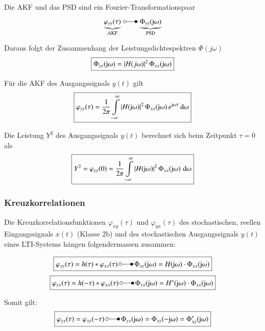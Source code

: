 Die AKF und das PSD sind ein Fourier-Transformationspaar
$$ \underbrace{\varphi_{yy}(\tau)}_{\text{AKF}} \, \laplace \, \underbrace{\Phi_{yy}(\jimg  \omega)}_{\text{PSD}} $$

Daraus folgt der Zusammenhang der Leistungsdichtespektren $\Phi(j \omega)$
$$ \boxed{ \Phi_{yy}(\mathrm{j}  \omega) = |H(j \omega)|^2 \, \Phi_{xx}(\mathrm{j}  \omega) } $$

Für die AKF des Ausgangssignals $y(t)$ gilt 
$$ \boxed{ \varphi_{yy}(\tau) = \frac{1}{2 \pi} \int\limits_{- \infty}^{\infty} |H(\mathrm{j}  \omega)|^2 \, \Phi_{xx}(\mathrm{j}  \omega) \, e^{\mathrm{j}  \omega \tau} \mathop{} \! \mathrm{d} \omega } $$

Die Leistung $Y^2$ des Ausgangssignals $y(t)$ berechnet sich beim Zeitpunkt $\tau = 0$ als
$$ \boxed{ Y^2 = \varphi_{yy}(0) = \frac{1}{2 \pi} \int\limits_{- \infty}^{\infty} |H(\mathrm{j}  \omega)|^2 \, \Phi_{xx}(\mathrm{j}  \omega) \, \mathop{} \! \mathrm{d} \omega } $$


\subsubsection{Kreuzkorrelationen}

Die Kreuzkorrelationsfunktionen $\varphi_{xy}(\tau)$ und $\varphi_{yx}(\tau)$ des stochastischen, reellen Eingangssignals $x(t)$ 
(Klasse 2b) und des stochastischen Ausgangssignals $y(t)$ eines LTI-Systems hängen folgendermassen zusammen:

$$ \boxed{ \varphi_{xy}(\tau) = h(\tau) * \varphi_{xx}(\tau) \, \laplace \, \Phi_{xy}(\jimg  \omega) = H(\jimg  \omega) \cdot \Phi_{xx}(\jimg  \omega) } $$
$$ \boxed{ \varphi_{yx}(\tau) = h(-\tau) * \varphi_{xx}(\tau) \, \laplace \, \Phi_{yx}(\jimg  \omega) = H^*(\jimg  \omega) \cdot \Phi_{xx}(\jimg  \omega) } $$

Somit gilt:
$$ \boxed{ \varphi_{yx}(\tau) = \varphi_{xy}(-\tau) \, \laplace \, \Phi_{yx}(\jimg  \omega) = \Phi_{xy}(-\jimg  \omega) = \Phi^*_{xy}(\jimg  \omega) } $$